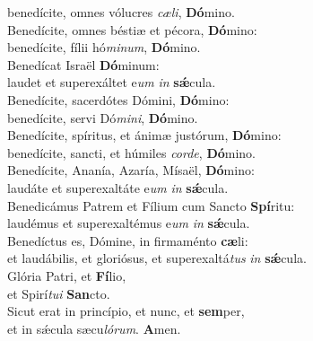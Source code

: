 \oddverse benedícite, omnes vólucres \textit{cæ}\textit{li}, \textbf{Dó}mino.\\
\evenverse Benedícite, omnes béstiæ et pécora, \textbf{Dó}mino:~\*\\
\evenverse benedícite, fílii hó\textit{mi}\textit{num}, \textbf{Dó}mino.\\
\oddverse Benedícat Israël \textbf{Dó}minum:~\*\\
\oddverse laudet et superexáltet e\textit{um} \textit{in} \textbf{sǽ}cula.\\
\evenverse Benedícite, sacerdótes Dómini, \textbf{Dó}mino:~\*\\
\evenverse benedícite, servi Dó\textit{mi}\textit{ni}, \textbf{Dó}mino.\\
\oddverse Benedícite, spíritus, et ánimæ justórum, \textbf{Dó}mino:~\*\\
\oddverse benedícite, sancti, et húmiles \textit{cor}\textit{de}, \textbf{Dó}mino.\\
\evenverse Benedícite, Ananía, Azaría, Mísaël, \textbf{Dó}mino:~\*\\
\evenverse laudáte et superexaltáte e\textit{um} \textit{in} \textbf{sǽ}cula.\\
\oddverse Benedicámus Patrem et Fílium cum Sancto \textbf{Spí}ritu:~\*\\
\oddverse laudémus et superexaltémus e\textit{um} \textit{in} \textbf{sǽ}cula.\\
\evenverse Benedíctus es, Dómine, in firmaménto \textbf{cæ}li:~\*\\
\evenverse et laudábilis, et gloriósus, et superexaltá\textit{tus} \textit{in} \textbf{sǽ}cula.\\
\oddverse Glória Patri, et \textbf{Fí}lio,~\*\\
\oddverse et Spirí\textit{tu}\textit{i} \textbf{San}cto.\\
\evenverse Sicut erat in princípio, et nunc, et \textbf{sem}per,~\*\\
\evenverse et in sǽcula sæcu\textit{ló}\textit{rum}. \textbf{A}men.\\

